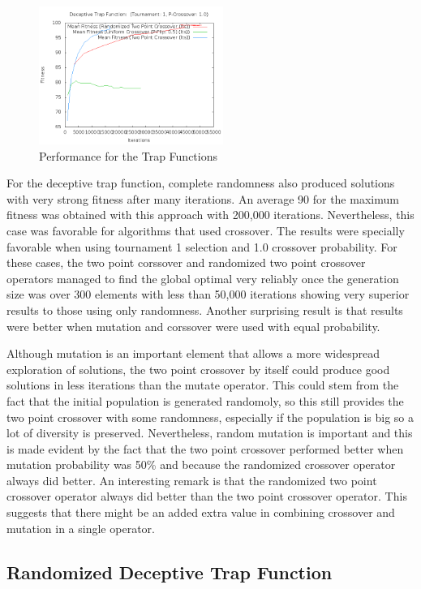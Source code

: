 \documentclass[10pt]{article}
\begin{document}
\begin{figure}[h!]
    \includegraphics[height=170px]{img/DeceptiveTrapFunctionCrossoverFitness.png}
    \caption[Performance for the Trap Functions]{Performance for the Trap Functions}
\end{figure}

For the deceptive trap function, complete randomness also produced solutions with very strong fitness after many iterations. An average 90 for the maximum fitness was obtained with this approach with 200,000 iterations. Nevertheless, this case was favorable for algorithms that used crossover. The results were specially favorable when using tournament 1 selection and 1.0 crossover probability. For these cases, the two point corssover and randomized two point crossover operators managed to find the global optimal very reliably once the generation size was over 300 elements with less than 50,000 iterations showing very superior results to those using only randomness. Another surprising result is that results were better when mutation and corssover were used with equal probability. 

Although mutation is an important element that allows a more widespread exploration of solutions, the two point crossover by itself could produce good solutions in less iterations than the mutate operator. This could stem from the fact that the initial population is generated randomoly, so this still provides the two point crossover with some randomness, especially if the population is big so a lot of diversity is preserved. Nevertheless, random mutation is important and this is made evident by the fact that the two point crossover performed better when mutation probability was 50\% and because the randomized crossover operator always did better. An interesting remark is that the randomized two point crossover operator always did better than the two point crossover operator. This suggests that there might be an added extra value in combining crossover and mutation in a single operator.

\pagebreak
\subsection{Randomized Deceptive Trap Function}
\end{document}

